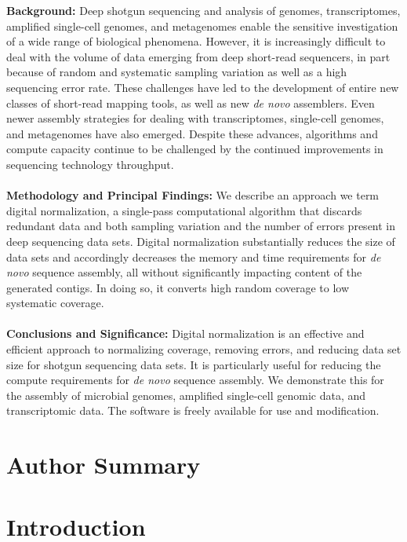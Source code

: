 \documentclass[10pt]{article}
\begin{document}
{\bf Background:} Deep shotgun sequencing and analysis of genomes,
transcriptomes, amplified single-cell genomes, and metagenomes enable
the sensitive investigation of a wide range of biological
phenomena. However, it is increasingly difficult to deal with the
volume of data emerging from deep short-read sequencers, in part
because of random and systematic sampling variation as well as a high
sequencing error rate.  These challenges have led to the development of
entire new classes of short-read mapping tools, as well as new {\em de novo}
assemblers.  Even newer assembly strategies for dealing with
transcriptomes, single-cell genomes, and metagenomes have also
emerged.  Despite these advances, algorithms and compute capacity
continue to be challenged by the continued improvements in sequencing
technology throughput.
\\
\\
{\bf Methodology and Principal Findings:} We describe an approach we term
digital normalization, a single-pass computational algorithm that
discards redundant data and both sampling variation and the number of errors
present in deep sequencing data sets. Digital normalization substantially
reduces the size of data sets and accordingly decreases the memory and time
requirements for {\em de novo} sequence assembly, all without significantly
impacting content of the generated contigs.  In doing so, it converts
high random coverage to low systematic coverage.
\\
\\
{\bf Conclusions and Significance:} Digital normalization is an
effective and efficient approach to normalizing coverage, removing errors,
and reducing data set size for shotgun sequencing data sets.
It is particularly useful for reducing the compute requirements for
{\em de novo} sequence assembly.  We demonstrate this for the assembly
of microbial genomes, amplified single-cell genomic data, and
transcriptomic data.  The software is freely available for use and
modification.

\section*{Author Summary}

\section*{Introduction}
\end{document}
